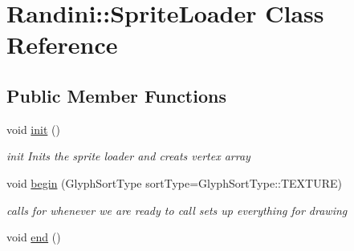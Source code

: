 \hypertarget{classRandini_1_1SpriteLoader}{
\section{Randini::SpriteLoader Class Reference}
\label{classRandini_1_1SpriteLoader}
}
\subsection*{Public Member Functions}
\begin{DoxyCompactItemize}
\item 
\hypertarget{classRandini_1_1SpriteLoader_a1929e27cf379b3b957b1acc5362b7331}{
void \hyperlink{classRandini_1_1SpriteLoader_a1929e27cf379b3b957b1acc5362b7331}{init} ()}
\label{classRandini_1_1SpriteLoader_a1929e27cf379b3b957b1acc5362b7331}

\begin{DoxyCompactList}\small\item\em init Inits the sprite loader and creats vertex array \item\end{DoxyCompactList}\item 
void \hyperlink{classRandini_1_1SpriteLoader_af4e355ad05c95b85af373d4f3d5a9c30}{begin} (GlyphSortType sortType=GlyphSortType::TEXTURE)
\begin{DoxyCompactList}\small\item\em calls for whenever we are ready to call sets up everything for drawing \item\end{DoxyCompactList}\item 
\hypertarget{classRandini_1_1SpriteLoader_af13de8f51b5c6428751cf417aa8efdc8}{
void \hyperlink{classRandini_1_1SpriteLoader_af13de8f51b5c6428751cf417aa8efdc8}{end} ()}
\label{classRandini_1_1SpriteLoader_af13de8f51b5c6428751cf417aa8efdc8}


\end{DoxyCompactItemize}
